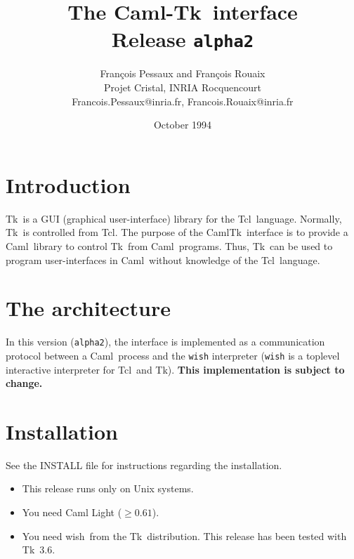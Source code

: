 
\newcommand{\tcl}{{\sf Tcl}}
\newcommand{\tk}{{\sf Tk}}
\newcommand{\caml}{{\sf Caml}}
\newcommand{\camltk}{{\sf CamlTk}}
\newcommand{\wish}{{\sf wish}}
\newcommand{\thisrelease}{{\tt alpha2}}
\title{The \caml-\tk\ interface \\
       Release \thisrelease}
\author{Fran\c{c}ois Pessaux and Fran\c{c}ois Rouaix \\
           Projet Cristal, INRIA Rocquencourt \\
        {\small Francois.Pessaux@inria.fr, Francois.Rouaix@inria.fr}
        }
\date{October 1994}

\maketitle


\section*{Introduction}
\tk\ is a GUI (graphical user-interface) library for the \tcl\ language.
Normally, \tk\ is controlled from \tcl. The purpose of the \camltk\
interface is to provide a \caml\ library to control \tk\ from \caml\
programs. Thus, \tk\ can be used to program user-interfaces in \caml\
without knowledge of the \tcl\ language.

\section*{The architecture}
In this version (\thisrelease), the interface is implemented as a
communication protocol between a \caml\ process and the {\tt wish}
interpreter ({\tt wish} is a toplevel interactive interpreter for 
\tcl\ and \tk).
{\bf This implementation is subject to change.}

\section*{Installation}
See the INSTALL file for instructions regarding the installation.
\begin{itemize}
\item This release runs only on Unix systems.
\item You need Caml Light ($\geq 0.61$).
\item You need \wish\, from the \tk\ distribution. This release has been
tested with \tk\ 3.6.
\end{itemize} 



